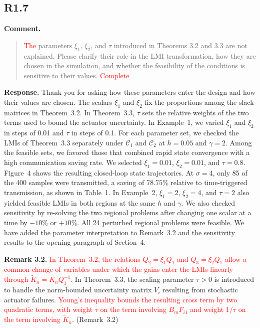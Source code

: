 \documentclass[12pt,a4paper]{article}
\begin{document}
\subsection*{R1.7}

\textbf{Comment.}
\begin{quote}
\raggedright
\textcolor{red}{The} parameters $\xi_1$, $\xi_2$, and $\tau$ introduced in Theorems 3.2 and 3.3 are not explained. Please clarify their role in the LMI transformation, how they are chosen in the simulation, and whether the feasibility of the conditions is sensitive to their values. \textcolor{red}{Complete}
\end{quote}

\begingroup
\setlength{\parskip}{6pt}
\textbf{Response.}
Thank you for asking how these parameters enter the design and how their values are chosen. The scalars $\xi_1$ and $\xi_2$ fix the proportions among the slack matrices in Theorem~3.2. In Theorem~3.3, $\tau$ sets the relative weights of the two terms used to bound the actuator uncertainty. In Example~1, we varied $\xi_1$ and $\xi_2$ in steps of 0.01 and $\tau$ in steps of 0.1. For each parameter set, we checked the LMIs of Theorem~3.3 separately under $\mathcal C_1$ and $\mathcal C_2$ at $h=0.05$ and $\gamma=2$. Among the feasible sets, we favored those that combined rapid state convergence with a high communication saving rate. We selected $\xi_1=0.01$, $\xi_2=0.01$, and $\tau=0.8$. Figure~4 shows the resulting closed-loop state trajectories. At $\sigma=4$, only 85 of the 400 samples were transmitted, a saving of $78.75\%$ relative to time-triggered transmission, as shown in Table~1. In Example~2, $\xi_1=2$, $\xi_2=4$, and $\tau=2$ also yielded feasible LMIs in both regions at the same $h$ and $\gamma$. We also checked sensitivity by re-solving the two regional problems after changing one scalar at a time by $-10\%$ or $+10\%$. All 24 perturbed regional problems were feasible. We have added the parameter interpretation to Remark~3.2 and the sensitivity results to the opening paragraph of Section~4.\par
\noindent \textbf{Remark 3.2.} \textcolor{red}{In Theorem~3.2, the relations $Q_2=\xi_1Q_1$ and $Q_3=\xi_2Q_1$ allow a common change of variables under which the gains enter the LMIs linearly through $\widetilde K_n=K_nQ_1^{-1}$.} In Theorem~3.3, the scaling parameter $\tau > 0$ is introduced to handle the norm-bounded uncertainty matrix $V_i$ resulting from stochastic actuator failures. \textcolor{red}{Young's inequality bounds the resulting cross term by two quadratic terms, with weight $\tau$ on the term involving $B_mF_{i1}$ and weight $1/\tau$ on the term involving $\widetilde K_n$.} (Remark~3.2)\par
\end{document}
